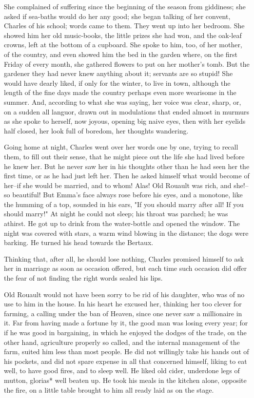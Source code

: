 \documentclass{tufte-book}
\begin{document}
She complained of suffering since the beginning of the season from
giddiness; she asked if sea-baths would do her any good; she began
talking of her convent, Charles of his school; words came to them. They
went up into her bedroom. She showed him her old music-books, the little
prizes she had won, and the oak-leaf crowns, left at the bottom of a
cupboard. She spoke to him, too, of her mother, of the country, and even
showed him the bed in the garden where, on the first Friday of every
month, she gathered flowers to put on her mother's tomb. But the
gardener they had never knew anything about it; servants are so stupid!
She would have dearly liked, if only for the winter, to live in town,
although the length of the fine days made the country perhaps even more
wearisome in the summer. And, according to what she was saying, her
voice was clear, sharp, or, on a sudden all languor, drawn out in
modulations that ended almost in murmurs as she spoke to herself, now
joyous, opening big naive eyes, then with her eyelids half closed, her
look full of boredom, her thoughts wandering.

Going home at night, Charles went over her words one by one, trying to
recall them, to fill out their sense, that he might piece out the life
she had lived before he knew her. But he never saw her in his thoughts
other than he had seen her the first time, or as he had just left her.
Then he asked himself what would become of her--if she would be married,
and to whom! Alas! Old Rouault was rich, and she!--so beautiful! But
Emma's face always rose before his eyes, and a monotone, like the
humming of a top, sounded in his ears, "If you should marry after
all! If you should marry!" At night he could not sleep; his throat was
parched; he was athirst. He got up to drink from the water-bottle and
opened the window. The night was covered with stars, a warm wind blowing
in the distance; the dogs were barking. He turned his head towards the
Bertaux.

Thinking that, after all, he should lose nothing, Charles promised
himself to ask her in marriage as soon as occasion offered, but each
time such occasion did offer the fear of not finding the right words
sealed his lips.

Old Rouault would not have been sorry to be rid of his daughter, who was
of no use to him in the house. In his heart he excused her, thinking
her too clever for farming, a calling under the ban of Heaven, since one
never saw a millionaire in it. Far from having made a fortune by it,
the good man was losing every year; for if he was good in bargaining, in
which he enjoyed the dodges of the trade, on the other hand, agriculture
properly so called, and the internal management of the farm, suited him
less than most people. He did not willingly take his hands out of his
pockets, and did not spare expense in all that concerned himself, liking
to eat well, to have good fires, and to sleep well. He liked old cider,
underdone legs of mutton, glorias* well beaten up. He took his meals in
the kitchen alone, opposite the fire, on a little table brought to him
all ready laid as on the stage.
\end{document}
